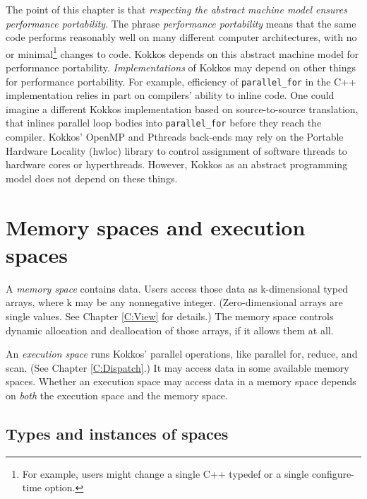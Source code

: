 The point of this chapter is that \emph{respecting the abstract machine model ensures performance portability}.
The phrase \emph{performance portability} means that the same code performs reasonably well on many different computer architectures,
with no or minimal\footnote{For example, users might change a single C++ typedef or a single configure-time option.} changes to code.
Kokkos depends on this abstract machine model for performance portability.
\emph{Implementations} of Kokkos may depend on other things for performance portability.
For example, efficiency of \lstinline!parallel_for! in the C++ implementation relies in part on compilers' ability to inline code.
One could imagine a different Kokkos implementation based on source-to-source translation,
that inlines parallel loop bodies into \lstinline!parallel_for! before they reach the compiler.
Kokkos' OpenMP and Pthreads back-ends may rely on the Portable Hardware Locality (hwloc) library
to control assignment of software threads to hardware cores or hyperthreads.
However, Kokkos as an abstract programming model does not depend on these things.

\section{Memory spaces and execution spaces}\label{S:Model:Spaces}

A \emph{memory space} contains data.
Users access those data as k-dimensional typed arrays, where k may be any nonnegative integer.
(Zero-dimensional arrays are single values.  See Chapter \ref{C:View} for details.)
The memory space controls dynamic allocation and deallocation of those arrays,
if it allows them at all.

An \emph{execution space} runs Kokkos' parallel operations,
like parallel for, reduce, and scan.  (See Chapter \ref{C:Dispatch}.)
It may access data in some available memory spaces.
Whether an execution space may access data in a memory space
depends on \emph{both} the execution space and the memory space.

\subsection{Types and instances of spaces}\label{SS:Model:Spaces:Types}

